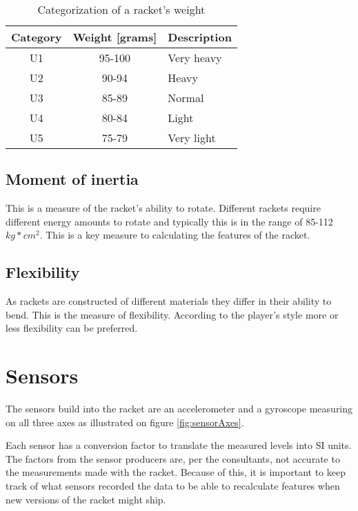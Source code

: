 \begin{table}
	\begin{center}
		\begin{tabularx}{0.7\textwidth}{C|C|L}
			\textbf{Category} & \textbf{Weight [grams]} & \textbf{Description} \\
			\hline
			U1                & 95-100                  & Very heavy           \\
			U2                & 90-94                   & Heavy                \\
			U3                & 85-89                   & Normal               \\
			U4                & 80-84                   & Light                \\
			U5                & 75-79                   & Very light           \\
		\end{tabularx}
	\end{center}
    \caption{Categorization of a racket's weight}
    \label{tab:racket:weight}
\end{table}

\subsection*{Moment of inertia}
This is a measure of the racket's ability to rotate.
Different rackets require different energy amounts to rotate and typically this is in the range of 85-112 \(kg*cm^2\).
This is a key measure to calculating the features of the racket.

\subsection*{Flexibility}
As rackets are constructed of different materials they differ in their ability to bend.
This is the measure of flexibility.
According to the player's style more or less flexibility can be preferred.

\section{Sensors}
The sensors build into the racket are an accelerometer and a gyroscope measuring on all three axes as illustrated on figure \ref{fig:sensorAxes}.

Each sensor has a conversion factor to translate the measured levels into SI units.
The factors from the sensor producers are, per the consultants, not accurate to the measurements made with the racket.
Because of this, it is important to keep track of what sensors recorded the data to be able to recalculate features when new versions of the racket might ship.

